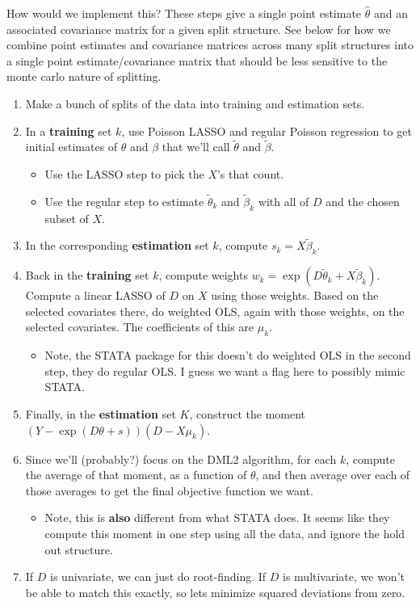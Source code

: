\documentclass[11pt]{article}
\begin{document}
How would we implement this?  These steps give a single point estimate $\widehat{\theta}$ and an associated covariance matrix for a given split structure.  See below for how we combine point estimates and covariance matrices across many split structures into a single point estimate/covariance matrix that should be less sensitive to the monte carlo nature of splitting.
\begin{enumerate}
	\item Make a bunch of splits of the data into training and estimation sets. 
	\item In a \textbf{training} set $k$, use Poisson LASSO and regular Poisson regression to get initial estimates of $\theta$ and $\beta$ that we'll call $\widetilde{\theta}$ and $\widetilde{\beta}$.
		\begin{itemize}
			\item Use the LASSO step to pick the $X$'s that count.
			\item Use the regular step to estimate $\widetilde{\theta}_k$ and $\widetilde{\beta}_k$ with all of $D$ and the chosen subset of $X$.
		\end{itemize}
	\item In the corresponding \textbf{estimation} set $k$, compute $s_k = X \widetilde{\beta}_k$.
	\item Back in the \textbf{training} set $k$, compute weights $w_k = \exp(D\widetilde{\theta}_k + X\widetilde{\beta}_k)$.  Compute a linear LASSO of $D$ on $X$ using those weights.  Based on the selected covariates there, do weighted OLS, again with those weights, on the selected covariates.  The coefficients of this are $\mu_k$.
		\begin{itemize}
			\item Note, the STATA package for this doesn't do weighted OLS in the second step, they do regular OLS.  I guess we want a flag here to possibly mimic STATA.
		\end{itemize}
	\item Finally, in the \textbf{estimation} set $K$, construct the moment $(Y - \exp(D\theta + s))(D - X\mu_k)$.
	\item Since we'll (probably?) focus on the DML2 algorithm, for each $k$, compute the average of that moment, as a function of $\theta$, and then average over each of those averages to get the final objective function we want.
		\begin{itemize}
			\item Note, this is \textbf{also} different from what STATA does.  It seems like they compute this moment in one step using all the data, and ignore the hold out structure.
		\end{itemize}
	\item If $D$ is univariate, we can just do root-finding.  If $D$ is multivariate, we won't be able to match this exactly, so lets minimize squared deviations from zero.   
\end{enumerate}
\end{document}
